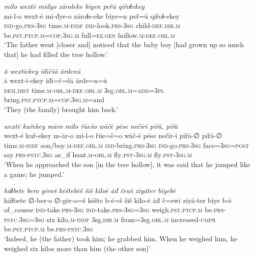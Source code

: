 \ea \label{ZB.49}
\textit{milo wextē miđyo zāroleke bīyen peřū qiřoɫekey} \\ 
\gll mi-l-o wext-ē mi-đye-o zāroɫe-eke bīye=n peř=ū qiřoɫ-ekey \\ 
 \textsc{ind-}go\textsc{.prs}\textsc{-3sg} time\textsc{.m}\textsc{-indf} \textsc{ind-}look\textsc{.prs}\textsc{-3sg} child\textsc{-def}\textsc{.dir}\textsc{.m} be\textsc{.pst}\textsc{.ptcp}\textsc{.m}\textsc{=cop}\textsc{.3sg}\textsc{.m} full\textsc{\textsc{=ez.gen}} hollow\textsc{.m}\textsc{-def}\textsc{.obl}\textsc{.m} \\ 
\glt `The father went [closer and] noticed that the baby boy [had grown up so much that] he had filled the tree hollow.'
\z 
 
\ea \label{ZB.50}
\textit{ā wextīekey īđīčšā ārdenū} \\ 
\gll ā wext-ī-ekey īđī=č=šā ārde=n=ū \\ 
 \textsc{dem.dist} time\textsc{.m}\textsc{-obl}\textsc{.m}\textsc{-def}\textsc{.obl}\textsc{.m} 3sg\textsc{.obl}\textsc{.m}\textsc{=add}\textsc{=3pl} bring\textsc{.pst}\textsc{.ptcp}\textsc{.m}\textsc{=cop}\textsc{.3sg}\textsc{.m}=and \\ 
\glt `They (the family) brought him back.'
\z 
 
\ea \label{ZB.56}
\textit{wextē kuřekey māro milo řūešo wāčē pēse nečīrī piřā, piřā} \\ 
\gll wext-ē kuř-ekey m-ār-o mi-l-o řūe=š=o wāč-ē pēse nečīr-ī piřā-∅ piřā-∅ \\ 
 time\textsc{.m}\textsc{-indf} son/boy\textsc{.m}\textsc{-def}\textsc{.obl}\textsc{.m} \textsc{ind-}bring\textsc{.prs}\textsc{-3sg} \textsc{ind-}go\textsc{.prs}\textsc{-3sg} face\textsc{=3sg}\textsc{=\textsc{post}} say\textsc{.prs-pstc}\textsc{.3sg} as\_if hunt\textsc{.m}\textsc{-obl}\textsc{.m} fly\textsc{.pst}\textsc{-3sg}\textsc{.m} fly\textsc{.pst}\textsc{-3sg}\textsc{.m} \\ 
\glt `When he approached the son [in the tree hollow], it was said that he jumped like a game; he jumped.'
\z 
 
\ea \label{ZB.57}
\textit{hāɫbete bero gēroš kēštebēš šiš kīloē āđ čewī zīyāter bīyebē} \\ 
\gll hāɫbete ∅-ber-o ∅-gēr-o=š kēšte b-ē=š šiš kīlo-ē āđ č=ewī zīyā-ter bīye b-ē \\ 
 of\_course \textsc{ind-}take\textsc{.prs}\textsc{-3sg} \textsc{ind-}take\textsc{.prs}\textsc{-3sg}\textsc{=3sg} weigh\textsc{.pst}\textsc{.ptcp}\textsc{.m} be\textsc{.prs}\textsc{-pstc}\textsc{.3sg}\textsc{=3sg} six kilo\textsc{.m}\textsc{-indf} 3sg\textsc{.dir}\textsc{.m} from=3sg\textsc{.obl}\textsc{.m} increased\textsc{-cmpr} be\textsc{.pst}\textsc{.ptcp}\textsc{.m} be\textsc{.prs}\textsc{-pstc}\textsc{.3sg} \\ 
\glt `Indeed, he (the father) took him; he grabbed him. When he weighed him, he weighed six kilos more than him (the other son)'
\z 
 
